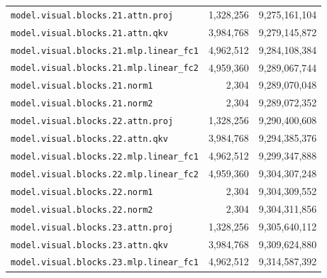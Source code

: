 \documentclass[10pt,a4paper]{article}
\theoremstyle{definition}
\begin{document}
\begin{appendices}
\begin{longtable}{p{9.5cm}rr}
\texttt{model.\allowbreak{}visual.\allowbreak{}blocks.\allowbreak{}21.\allowbreak{}attn.\allowbreak{}proj} & 1,328,256 & 9,275,161,104 \\
\texttt{model.\allowbreak{}visual.\allowbreak{}blocks.\allowbreak{}21.\allowbreak{}attn.\allowbreak{}qkv} & 3,984,768 & 9,279,145,872 \\
\texttt{model.\allowbreak{}visual.\allowbreak{}blocks.\allowbreak{}21.\allowbreak{}mlp.\allowbreak{}linear\_fc1} & 4,962,512 & 9,284,108,384 \\
\texttt{model.\allowbreak{}visual.\allowbreak{}blocks.\allowbreak{}21.\allowbreak{}mlp.\allowbreak{}linear\_fc2} & 4,959,360 & 9,289,067,744 \\
\texttt{model.\allowbreak{}visual.\allowbreak{}blocks.\allowbreak{}21.\allowbreak{}norm1} & 2,304 & 9,289,070,048 \\
\texttt{model.\allowbreak{}visual.\allowbreak{}blocks.\allowbreak{}21.\allowbreak{}norm2} & 2,304 & 9,289,072,352 \\
\texttt{model.\allowbreak{}visual.\allowbreak{}blocks.\allowbreak{}22.\allowbreak{}attn.\allowbreak{}proj} & 1,328,256 & 9,290,400,608 \\
\texttt{model.\allowbreak{}visual.\allowbreak{}blocks.\allowbreak{}22.\allowbreak{}attn.\allowbreak{}qkv} & 3,984,768 & 9,294,385,376 \\
\texttt{model.\allowbreak{}visual.\allowbreak{}blocks.\allowbreak{}22.\allowbreak{}mlp.\allowbreak{}linear\_fc1} & 4,962,512 & 9,299,347,888 \\
\texttt{model.\allowbreak{}visual.\allowbreak{}blocks.\allowbreak{}22.\allowbreak{}mlp.\allowbreak{}linear\_fc2} & 4,959,360 & 9,304,307,248 \\
\texttt{model.\allowbreak{}visual.\allowbreak{}blocks.\allowbreak{}22.\allowbreak{}norm1} & 2,304 & 9,304,309,552 \\
\texttt{model.\allowbreak{}visual.\allowbreak{}blocks.\allowbreak{}22.\allowbreak{}norm2} & 2,304 & 9,304,311,856 \\
\texttt{model.\allowbreak{}visual.\allowbreak{}blocks.\allowbreak{}23.\allowbreak{}attn.\allowbreak{}proj} & 1,328,256 & 9,305,640,112 \\
\texttt{model.\allowbreak{}visual.\allowbreak{}blocks.\allowbreak{}23.\allowbreak{}attn.\allowbreak{}qkv} & 3,984,768 & 9,309,624,880 \\
\texttt{model.\allowbreak{}visual.\allowbreak{}blocks.\allowbreak{}23.\allowbreak{}mlp.\allowbreak{}linear\_fc1} & 4,962,512 & 9,314,587,392 \\

\end{longtable}
\end{appendices}
\end{document}
